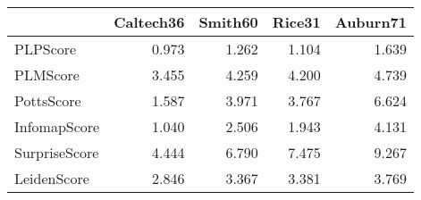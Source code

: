 \begin{tabular}{lrrrr}
\toprule
{} & Caltech36 & Smith60 & Rice31 & Auburn71 \\
\midrule
PLPScore      &     0.973 &   1.262 &  1.104 &    1.639 \\
PLMScore      &     3.455 &   4.259 &  4.200 &    4.739 \\
PottsScore    &     1.587 &   3.971 &  3.767 &    6.624 \\
InfomapScore  &     1.040 &   2.506 &  1.943 &    4.131 \\
SurpriseScore &     4.444 &   6.790 &  7.475 &    9.267 \\
LeidenScore   &     2.846 &   3.367 &  3.381 &    3.769 \\
\bottomrule
\end{tabular}
